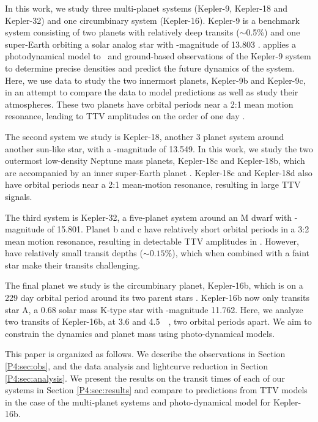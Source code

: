 In this work, we study three multi-planet systems (Kepler-9, Kepler-18 and Kepler-32) and one circumbinary system (Kepler-16). Kepler-9 is a benchmark system consisting of two planets with relatively deep transits ($\sim$0.5\%) and one super-Earth orbiting a solar analog star with \Kepler-magnitude of 13.803 \citep{Holman2010}. \citet{Freudenthal2018} applies a photodynamical model to \Kepler~and ground-based observations of the Kepler-9 system to determine precise densities and predict the future dynamics of the system. Here, we use \spitzerIRAC data to study the two innermost planets, Kepler-9b and Kepler-9c, in an attempt to compare the data to model predictions as well as study their atmospheres. These two planets have orbital periods near a 2:1 mean motion resonance, leading to TTV amplitudes on the order of one day \citep{Freudenthal2018}.

The second system we study is Kepler-18, another 3 planet system around another sun-like star, with a \Kepler-magnitude of 13.549. In this work, we study the two outermost low-density Neptune mass planets, Kepler-18c and Kepler-18b, which are accompanied by an inner super-Earth planet \citet{Cochran2011}. Kepler-18c and Kepler-18d also have orbital periods near a 2:1 mean-motion resonance, resulting in large TTV signals.

The third system is Kepler-32, a five-planet system around an M dwarf \citep{Muirhead2012} with \Kepler-magnitude of 15.801. Planet b and c have relatively short orbital periods in a 3:2 mean motion resonance, resulting in detectable TTV amplitudes in \Kepler. However, have relatively small transit depths ($\sim0.15$\%), which when combined with a faint star make their transits challenging.

The final planet we study is the circumbinary planet, Kepler-16b, which is on a 229 day orbital period around its two parent stars \citep{Doyle2011}. Kepler-16b now only transits star A, a 0.68 solar mass K-type star with \Kepler-magnitude 11.762. Here, we analyze two transits of Kepler-16b, at 3.6 and 4.5~\um~, two orbital periods apart. We aim to constrain the dynamics and planet mass using photo-dynamical models.


This paper is organized as follows. We describe the observations in Section \ref{P4:sec:obs}, and the data analysis and lightcurve reduction in Section \ref{P4:sec:analysis}. We present the results on the transit times of each of our systems in Section \ref{P4:sec:results} and compare to predictions from TTV models in the case of the multi-planet systems and photo-dynamical model for Kepler-16b.

